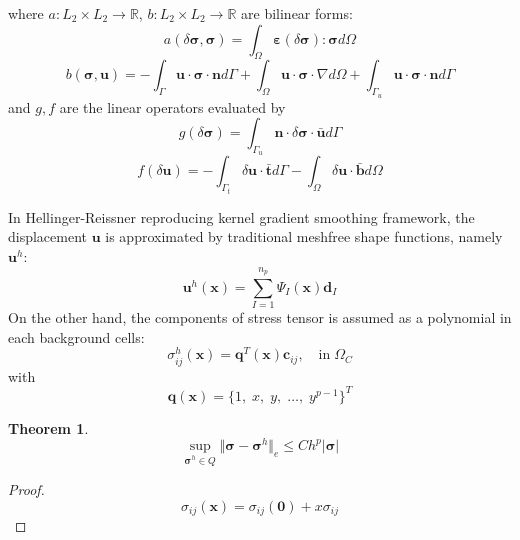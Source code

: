 \documentclass{article}
\newtheorem{theorem}{Theorem}
\begin{document}
where $a:L_2\times L_2\rightarrow \mathbb R$, $b:L_2\times L_2 \rightarrow \mathbb R$ are bilinear forms: 
\begin{equation}
    a(\delta \boldsymbol \sigma,\boldsymbol \sigma) = \int_{\Omega} \boldsymbol \varepsilon(\delta \boldsymbol \sigma):\boldsymbol \sigma d\Omega
\end{equation}
\begin{equation}
    b(\boldsymbol \sigma,\boldsymbol u) = - \int_{\Gamma} \boldsymbol u \cdot \boldsymbol \sigma \cdot \boldsymbol n d\Gamma + \int_{\Omega} \boldsymbol u \cdot \boldsymbol \sigma \cdot \nabla d\Omega + \int_{\Gamma_u} \boldsymbol u \cdot \boldsymbol \sigma \cdot \boldsymbol n d\Gamma
\end{equation}
and $g,f$ are the linear operators evaluated by
\begin{equation}
    g(\delta \boldsymbol \sigma) = \int_{\Gamma_u} \boldsymbol n \cdot \delta \boldsymbol \sigma \cdot \bar{\boldsymbol u} d\Gamma
\end{equation}
\begin{equation}
    f(\delta \boldsymbol u) = - \int_{\Gamma_t} \delta \boldsymbol u \cdot \bar{\boldsymbol t} d\Gamma - \int_{\Omega} \delta \boldsymbol u \cdot \bar{\boldsymbol b} d\Omega
\end{equation} \par
In Hellinger-Reissner reproducing kernel gradient smoothing framework, the displacement $\boldsymbol u$ is approximated by traditional meshfree shape functions, namely $\boldsymbol u^h$:
\begin{equation}
    \boldsymbol u^h(\boldsymbol x) = \sum_{I=1}^{n_p} \Psi_I(\boldsymbol x) \boldsymbol d_I
\end{equation}
On the other hand, the components of stress tensor is assumed as a polynomial in each background cells:
\begin{equation}
    \sigma^h_{ij}(\boldsymbol x) = \boldsymbol q^T(\boldsymbol x) \boldsymbol c_{ij}, \quad \mathrm{in}\; \Omega_C
\end{equation}
with
\begin{equation}
    \boldsymbol q(\boldsymbol x) = \{1,\;x,\;y,\;\dots,\;y^{p-1}\}^T
\end{equation}
\begin{theorem}
    \begin{equation}
        \sup_{\boldsymbol \sigma^h \in Q}\Vert \boldsymbol \sigma - \boldsymbol \sigma^h \Vert_{e} \le Ch^{p} \vert \boldsymbol \sigma \vert
    \end{equation}
\end{theorem}
\begin{proof}
    \begin{equation}
        \sigma_{ij}(\boldsymbol{x}) = \sigma_{ij}(\boldsymbol{0}) + x \sigma_{ij}
    \end{equation}
\end{proof}
\end{document}
